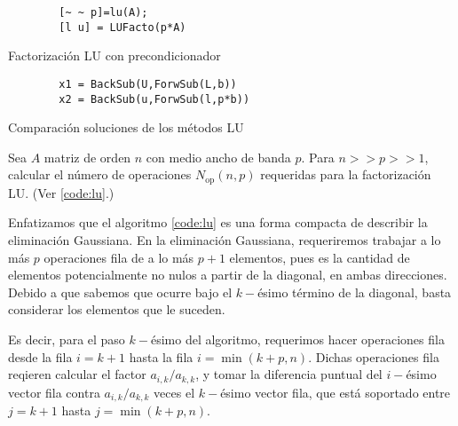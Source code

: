 \begin{listing}[hb!]
    \begin{verbatim}
        [~ ~ p]=lu(A);
        [l u] = LUFacto(p*A)
    \end{verbatim}
    \caption{Factorizaci\'on LU con precondicionador}
    \label{code:lu2}
\end{listing}

\begin{listing}[hb!]
    \begin{verbatim}
        x1 = BackSub(U,ForwSub(L,b))
        x2 = BackSub(u,ForwSub(l,p*b))
    \end{verbatim}
    \caption{Comparaci\'on soluciones de los m\'etodos LU}
    \label{code:lu-solver}
\end{listing}

\begin{problema}
    Sea \(A\) matriz de orden \(n\) con medio ancho de banda \(p\). Para \(n >> p >> 1\), calcular el n\'umero de operaciones \(N_\mathrm{op}(n,p)\) requeridas para la factorizaci\'on LU. (Ver \eqref{code:lu}.)
\end{problema}

Enfatizamos que el algoritmo \eqref{code:lu} es una forma compacta de describir la eliminaci\'on Gaussiana. En la eliminaci\'on Gaussiana, requeriremos trabajar a lo m\'as \(p\) operaciones fila de a lo m\'as \(p+1\) elementos, pues es la cantidad de elementos potencialmente no nulos a partir de la diagonal, en ambas direcciones. Debido a que sabemos que ocurre bajo el \(k-\)\'esimo t\'ermino de la diagonal, basta considerar los elementos que le suceden.

Es decir, para el paso \(k-\)\'esimo del algoritmo, requerimos hacer operaciones fila desde la fila \(i=k+1\) hasta la fila \(i=\min (k+p,n)\). Dichas operaciones fila reqieren calcular el factor \(a_{i,k}/a_{k,k}\), y tomar la diferencia puntual del \(i-\)\'esimo vector fila contra \(a_{i,k}/a_{k,k}\) veces el \(k-\)\'esimo vector fila, que est\'a soportado entre \(j=k+1\) hasta \(j=\min (k+p,n)\).

